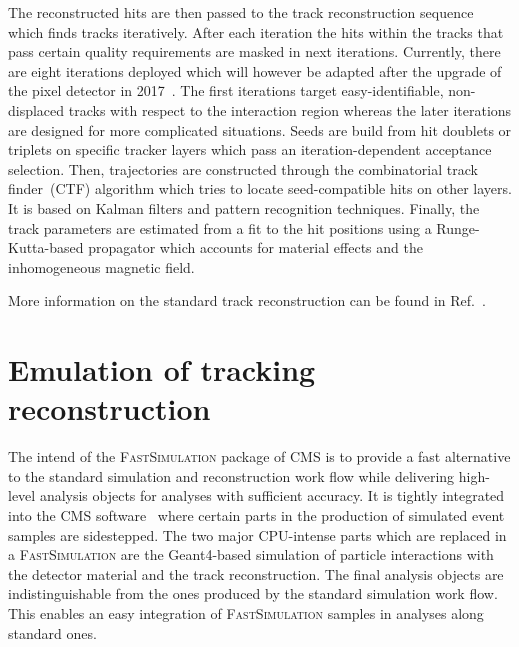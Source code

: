 \documentclass[a4paper]{jpconf}
\begin{document}
The reconstructed hits are then passed to the track reconstruction sequence which finds tracks iteratively. After each iteration the hits within the tracks that pass certain quality requirements are masked in next iterations. Currently, there are eight iterations deployed which will however be adapted after the upgrade of the pixel detector in 2017~\cite{pixelphase1}. The first iterations target easy-identifiable, non-displaced tracks with respect to the interaction region whereas the later iterations are designed for more complicated situations. Seeds are build from hit doublets or triplets on specific tracker layers which pass an iteration-dependent acceptance selection. Then, trajectories are constructed through the combinatorial track finder~(CTF) algorithm which tries to locate seed-compatible hits on other layers. It is based on Kalman filters and pattern recognition techniques.  Finally, the track parameters are estimated from a fit to the hit positions using a Runge-Kutta-based propagator which accounts for material effects and the inhomogeneous magnetic field.

More information on the standard track reconstruction can be found in Ref.~\cite{trackreco}.


\section{Emulation of tracking reconstruction}

The intend of the \textsc{FastSimulation} package of CMS is to provide a fast alternative to the standard simulation and reconstruction work flow while delivering high-level analysis objects for analyses with sufficient accuracy. It is tightly integrated into the CMS software~\cite{cmssw} where certain parts in the production of simulated event samples are sidestepped. The two major CPU-intense parts which are replaced in a \textsc{FastSimulation} are the Geant4-based simulation of particle interactions with the detector material and the track reconstruction. The final analysis objects are indistinguishable from the ones produced by the standard simulation work flow. This enables an easy integration of \textsc{FastSimulation} samples in analyses along standard ones.
\end{document}
